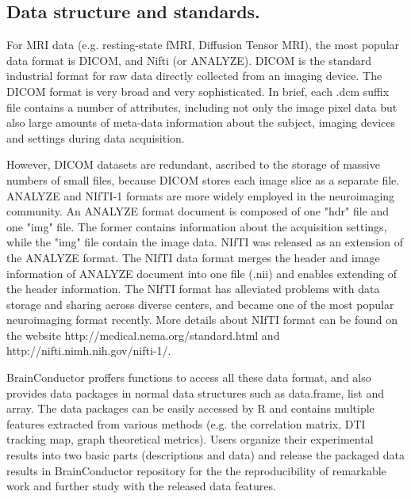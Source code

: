 \documentclass{nature}
\begin{document}
\begin{methods}

\subsection{Data structure and standards.} 
For MRI data (e.g. resting-state fMRI, Diffusion Tensor MRI), the most popular data format is DICOM, and Nifti (or ANALYZE). DICOM is the standard industrial format for raw data directly collected from an imaging device. The DICOM format is very broad and very sophisticated. In brief, each .dcm suffix file contains a number of attributes, including not only the image pixel data but also large amounts of meta-data information about the subject, imaging devices and settings during data acquisition.  

However, DICOM datasets are redundant, ascribed to the storage of massive numbers of small files, because DICOM stores each image slice as a separate file. ANALYZE and NIfTI-1 formats are more widely employed in the neuroimaging community. An ANALYZE format document is composed of one "hdr" file and one "img" file. The former contains information about the acquisition settings, while the "img" file contain the image data. NIfTI was released as an extension of the ANALYZE format. The NIfTI data format merges the header and image information of ANALYZE document into one file (.nii) and enables extending of the header information. The NIfTI format has alleviated problems with data storage and sharing across diverse centers, and became one of the most popular neuroimaging format recently. More details about NIfTI format can be found on the website http://medical.nema.org/standard.html and http://nifti.nimh.nih.gov/nifti-1/.   

BrainConductor proffers functions to access all these data format, and also provides data packages in normal data structures such as data.frame, list and array. The data packages can be easily accessed by R and contains multiple features extracted from various methods (e.g. the correlation matrix, DTI tracking map, graph theoretical metrics). Users organize their experimental results into two basic parts (descriptions and data) and release the packaged data results in BrainConductor repository for the the reproducibility of remarkable work and further study with the released data features.  


\end{methods}
\end{document}
